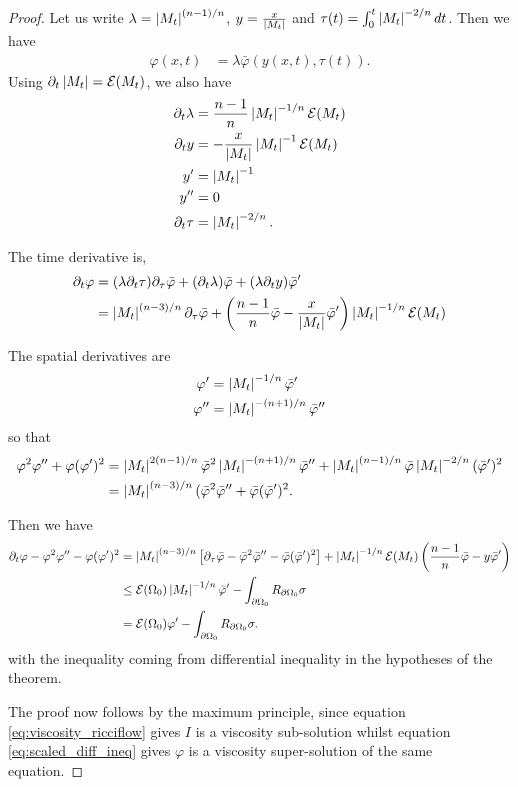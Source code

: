\documentclass{amsart}
\begin{document}
\begin{proof}
Let us write \(\lambda = \left|{M_t}\right|^{(n-1)/n}\), \(y = \frac{x}{\left|{M_t}\right|}\) and \(\tau(t) = \int_0^t \left|{M_t}\right|^{-2/n} dt\). Then we have
\[
\begin{split}
\varphi(x, t) &= \lambda \bar{\varphi} (y(x,t), \tau(t)).
\end{split}
\]
Using \(\partial_t \left|{M_t}\right| = \operatorname{\mathcal{E}}(M_t)\), we also have
\begin{align*}
\partial_t \lambda &= \frac{n-1}{n} \left|{M_t}\right|^{-1/n} \operatorname{\mathcal{E}}(M_t) \\
\partial_t y &= -\frac{x}{\left|{M_t}\right|} \left|{M_t}\right|^{-1} \operatorname{\mathcal{E}}(M_t) \\
y' &= \left|{M_t}\right|^{-1} \\
y'' &= 0 \\
\partial_t \tau &= \left|{M_t}\right|^{-2/n}.
\end{align*}

The time derivative is,
\[
\begin{split}
\partial_t \varphi &= (\lambda \partial_t \tau) \partial_{\tau} \bar{\varphi} + (\partial_t \lambda) \bar{\varphi} + (\lambda \partial_t y) \bar{\varphi}' \\
&= \left|{M_t}\right|^{(n-3)/n} \partial_{\tau} \bar{\varphi} + \left(\frac{n-1}{n} \bar{\varphi} - \frac{x}{\left|{M_t}\right|} \bar{\varphi}'\right) \left|{M_t}\right|^{-1/n} \operatorname{\mathcal{E}}(M_t)
\end{split}
\]

The spatial derivatives are
\begin{align*}
\varphi' &= \left|{M_t}\right|^{-1/n} \bar{\varphi}' \\
\varphi'' &= \left|{M_t}\right|^{-(n+1)/n} \bar{\varphi}''
\end{align*}
so that
\[
\begin{split}
\varphi^2 \varphi'' + \varphi(\varphi')^2 &= \left|{M_t}\right|^{2(n-1)/n} \bar{\varphi}^2 \left|{M_t}\right|^{-(n+1)/n} \bar{\varphi}'' + \left|{M_t}\right|^{(n-1)/n} \bar{\varphi} \left|{M_t}\right|^{-2/n} (\bar{\varphi}')^2 \\
&= \left|{M_t}\right|^{(n-3)/n} (\bar{\varphi}^2 \bar{\varphi}'' + \bar{\varphi}(\bar{\varphi}')^2.
\end{split}
\]

Then we have
\begin{equation}
\label{eq:scaled_diff_ineq}
\begin{split}
\partial_t \varphi - \varphi^2 \varphi'' - \varphi(\varphi')^2 &= \left|{M_t}\right|^{(n-3)/n}\left[ \partial_{\tau} \bar{\varphi} -\bar{\varphi}^2 \bar{\varphi}'' - \bar{\varphi}(\bar{\varphi}')^2\right] + \left|{M_t}\right|^{-1/n} \operatorname{\mathcal{E}}(M_t) \left(\frac{n-1}{n} \bar{\varphi} - y\bar{\varphi}'\right) \\
&\leq \operatorname{\mathcal{E}}(\Omega_0) \left|{M_t}\right|^{-1/n} \bar{\varphi}' - \int_{\partial {\Omega_0}} R_{\partial {\Omega_0}}\sigma \\
&= \operatorname{\mathcal{E}}(\Omega_0) \varphi' - \int_{\partial {\Omega_0}} R_{\partial {\Omega_0}}\sigma.
\end{split}
\end{equation}
with the inequality coming from differential inequality in the hypotheses of the theorem.

The proof now follows by the maximum principle, since equation \eqref{eq:viscosity_ricciflow} gives \(I\) is a viscosity sub-solution whilst equation \eqref{eq:scaled_diff_ineq} gives \(\varphi\) is a viscosity super-solution of the same equation.
\end{proof}
\end{document}
